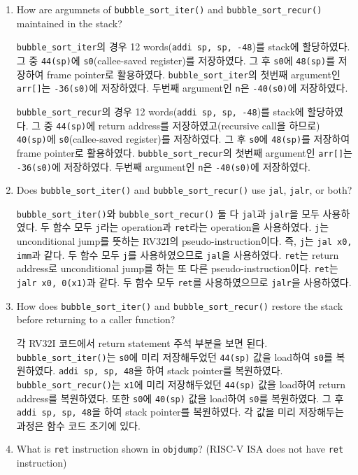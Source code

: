 \documentclass[
    a4paper,
    oneside,
    adjustmath,
    finemath,
    itemph,
    nonfrench,
    11pt
]{oblivoir}
\begin{document}
    \begin{enumerate}
        \item How are argumnets of \verb|bubble_sort_iter()| and \verb|bubble_sort_recur()| maintained in the stack?

        \verb|bubble_sort_iter|의 경우 12 words(\verb|addi sp, sp, -48|)를 stack에 할당하였다.
        그 중 \verb|44(sp)|에 \verb|s0|(callee-saved register)를 저장하였다.
        그 후 \verb|s0|에 \verb|48(sp)|를 저장하여 frame pointer로 활용하였다.
        \verb|bubble_sort_iter|의 첫번째 argument인 \verb|arr[]|는 \verb|-36(s0)|에 저장하였다.
        두번째 argument인 \verb|n|은 \verb|-40(s0)|에 저장하였다.

        \verb|bubble_sort_recur|의 경우 12 words(\verb|addi sp, sp, -48|)를 stack에 할당하였다.
        그 중 \verb|44(sp)|에 return address를 저장하였고(recursive call을 하므로) \verb|40(sp)|에 \verb|s0|(callee-saved register)를 저장하였다.
        그 후 \verb|s0|에 \verb|48(sp)|를 저장하여 frame pointer로 활용하였다.
        \verb|bubble_sort_recur|의 첫번째 argument인 \verb|arr[]|는 \verb|-36(s0)|에 저장하였다.
        두번째 argument인 \verb|n|은 \verb|-40(s0)|에 저장하였다.
        \item Does \verb|bubble_sort_iter()| and \verb|bubble_sort_recur()| use \verb|jal|, \verb|jalr|, or both?

        \verb|bubble_sort_iter()|와 \verb|bubble_sort_recur()| 둘 다 \verb|jal|과 \verb|jalr|을 모두 사용하였다.
        두 함수 모두 \verb|j|라는 operation과 \verb|ret|라는 operation을 사용하였다.
        \verb|j|는 unconditional jump를 뜻하는 RV32I의 pseudo-instruction이다.
        즉, \verb|j|는 \verb|jal x0, imm|과 같다.
        두 함수 모두 \verb|j|를 사용하였으므로 \verb|jal|을 사용하였다.
        \verb|ret|는 return address로 unconditional jump를 하는 또 다른 pseudo-instruction이다.
        \verb|ret|는 \verb|jalr x0, 0(x1)|과 같다.
        두 함수 모두 \verb|ret|를 사용하였으므로 \verb|jalr|을 사용하였다.
        \item How does \verb|bubble_sort_iter()| and \verb|bubble_sort_recur()| restore the stack before returning to a caller function?

        각 RV32I 코드에서 return statement 주석 부분을 보면 된다.
        \verb|bubble_sort_iter()|는 \verb|s0|에 미리 저장해두었던 \verb|44(sp)| 값을 load하여 \verb|s0|를 복원하였다.
        \verb|addi sp, sp, 48|을 하여 stack pointer를 복원하였다.
        \verb|bubble_sort_recur()|는 \verb|x1|에 미리 저장해두었던 \verb|44(sp)| 값을 load하여 return address를 복원하였다.
        또한 \verb|s0|에 \verb|40(sp)| 값을 load하여 \verb|s0|를 복원하였다.
        그 후 \verb|addi sp, sp, 48|을 하여 stack pointer를 복원하였다.
        각 값을 미리 저장해두는 과정은 함수 코드 초기에 있다.
        \item What is \verb|ret| instruction shown in \verb|objdump|? (RISC-V ISA does not have \verb|ret| instruction)


\end{enumerate}
\end{document}
